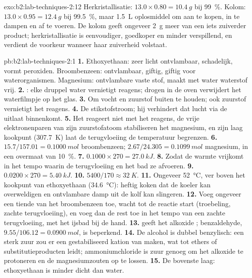 \begin{solution}{exo:b2:lab-techniques-2:12}
Herkristallisatie: $13.0 \times 0.80 = \qty{10.4}{g}$ bij 99~\%. Kolom: $13.0 \times 0.95 =
\qty{12.4}{g}$ bij 99.5~\%, maar \qty{1.5}{L} oplosmiddel om aan te kopen, in te dampen en af te voeren. De kolom geeft
ongeveer \qty{2}{g} meer van een iets zuiverder product; herkristallisatie is eenvoudiger, goedkoper en minder
verspillend, en verdient de voorkeur wanneer haar zuiverheid volstaat.
\end{solution}

\begin{solution}{pb:b2:lab-techniques-2:1}
\textbf{1.} Ethoxyethaan: zeer licht ontvlambaar, schadelijk, vormt peroxiden. Broombenzeen: ontvlambaar, giftig,
giftig voor waterorganismen. Magnesium: ontvlambare vaste stof, maakt met water waterstof vrij.
\textbf{2.} : elke druppel water vernietigt reagens; drogen in de oven
verwijdert het waterfilmpje op het glas.
\textbf{3.} Om vocht en zuurstof buiten te houden; ook zuurstof vernietigt het reagens.
\textbf{4.} De stikstofstroom; hij verhindert dat lucht via de uitlaat binnenkomt.
\textbf{5.} Het reageert niet met het reagens, de vrije elektronenparen van zijn zuurstofatoom stabiliseren het magnesium, en zijn
laag kookpunt (\qty{307.7}{K}) laat de terugvloeiing de temperatuur begrenzen.
\textbf{6.} $15.7/157.01 = \qty{0.1000}{mol}$ broombenzeen; $2.67/24.305 = \qty{0.1099}{mol}$ magnesium,
in een overmaat van 10~\%.
\textbf{7.} $0.1000 \times 270 = \qty{27.0}{kJ}$.
\textbf{8.} Zodat de warmte vrijkomt in het tempo waarin de terugvloeiing en het bad ze afvoeren.
\textbf{9.} $0.0200 \times 270 = \qty{5.40}{kJ}$.
\textbf{10.} $5400/170 \approx \qty{32}{K}$.
\textbf{11.} Ongeveer \qty{52}{\degreeCelsius}, ver boven het kookpunt van ethoxyethaan
(\qty{34.6}{\degreeCelsius}): heftig koken dat de koeler kan overweldigen en ontvlambare damp
uit de kolf kan slingeren.
\textbf{12.} Voeg ongeveer een tiende van het broombenzeen toe, wacht tot de reactie start (troebeling, zachte
terugvloeiing), en voeg dan de rest toe in het tempo van een zachte terugvloeiing, met het ijsbad bij de hand.
\textbf{13.}  geeft het alkoxide ; benzaldehyde,
$9.55/106.12 = \qty{0.0900}{mol}$, is beperkend.
\textbf{14.} De alcohol is dubbel benzylisch: een sterk zuur zou er een gestabiliseerd kation van maken,
wat tot ethers of substitutieproducten leidt; ammoniumchloride is zuur genoeg om het alkoxide te protoneren
en de magnesiumzouten op te lossen.
\textbf{15.} De bovenste laag: ethoxyethaan is minder dicht dan water.

\end{solution}
